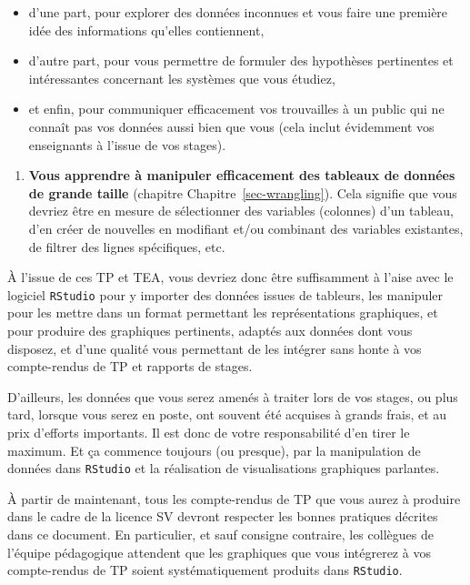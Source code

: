 \documentclass[
  a4paper,
  DIV=11,
  numbers=noendperiod,
  oneside]{scrreprt}
\providecommand{\tightlist}{%
  \setlength{\itemsep}{0pt}\setlength{\parskip}{0pt}}\usepackage{longtable,booktabs,array}
\begin{document}
\begin{itemize}
\tightlist
\item
  d'une part, pour explorer des données inconnues et vous faire une
  première idée des informations qu'elles contiennent,
\item
  d'autre part, pour vous permettre de formuler des hypothèses
  pertinentes et intéressantes concernant les systèmes que vous étudiez,
\item
  et enfin, pour communiquer efficacement vos trouvailles à un public
  qui ne connaît pas vos données aussi bien que vous (cela inclut
  évidemment vos enseignants à l'issue de vos stages).
\end{itemize}

\begin{enumerate}
\def\labelenumi{\arabic{enumi}.}
\setcounter{enumi}{2}
\tightlist
\item
  \textbf{Vous apprendre à manipuler efficacement des tableaux de
  données de grande taille} (chapitre Chapitre~\ref{sec-wrangling}).
  Cela signifie que vous devriez être en mesure de sélectionner des
  variables (colonnes) d'un tableau, d'en créer de nouvelles en
  modifiant et/ou combinant des variables existantes, de filtrer des
  lignes spécifiques, etc.
\end{enumerate}

À l'issue de ces TP et TEA, vous devriez donc être suffisamment à l'aise
avec le logiciel \texttt{RStudio} pour y importer des données issues de
tableurs, les manipuler pour les mettre dans un format permettant les
représentations graphiques, et pour produire des graphiques pertinents,
adaptés aux données dont vous disposez, et d'une qualité vous permettant
de les intégrer sans honte à vos compte-rendus de TP et rapports de
stages.

D'ailleurs, les données que vous serez amenés à traiter lors de vos
stages, ou plus tard, lorsque vous serez en poste, ont souvent été
acquises à grands frais, et au prix d'efforts importants. Il est donc de
votre responsabilité d'en tirer le maximum. Et ça commence toujours (ou
presque), par la manipulation de données dans \texttt{RStudio} et la
réalisation de visualisations graphiques parlantes.

\begin{tcolorbox}[enhanced jigsaw, arc=.35mm, opacityback=0, colbacktitle=quarto-callout-important-color!10!white, bottomrule=.15mm, coltitle=black, colframe=quarto-callout-important-color-frame, breakable, toprule=.15mm, title=\textcolor{quarto-callout-important-color}{\faExclamation}\hspace{0.5em}{Important}, leftrule=.75mm, titlerule=0mm, bottomtitle=1mm, toptitle=1mm, left=2mm, rightrule=.15mm, opacitybacktitle=0.6, colback=white]

À partir de maintenant, tous les compte-rendus de TP que vous aurez à
produire dans le cadre de la licence SV devront respecter les bonnes
pratiques décrites dans ce document. En particulier, et sauf consigne
contraire, les collègues de l'équipe pédagogique attendent que les
graphiques que vous intégrerez à vos compte-rendus de TP soient
systématiquement produits dans \texttt{RStudio}.

\end{tcolorbox}
\end{document}
